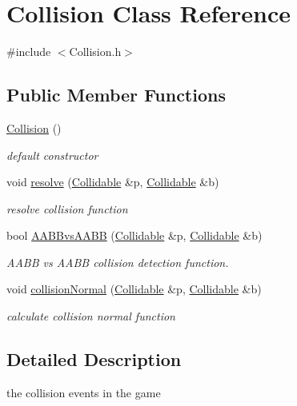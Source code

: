 \hypertarget{class_collision}{\section{Collision Class Reference}
\label{class_collision}
}


{\ttfamily \#include $<$Collision.\-h$>$}

\subsection*{Public Member Functions}
\begin{DoxyCompactItemize}
\item 
\hypertarget{class_collision_aea8004fbf48b79b5db7b784688b23788}{\hyperlink{class_collision_aea8004fbf48b79b5db7b784688b23788}{Collision} ()}\label{class_collision_aea8004fbf48b79b5db7b784688b23788}

\begin{DoxyCompactList}\small\item\em default constructor \end{DoxyCompactList}\item 
void \hyperlink{class_collision_a9e0c3a25faa3b248ada31d1b1ed3ca1f}{resolve} (\hyperlink{class_collidable}{Collidable} \&p, \hyperlink{class_collidable}{Collidable} \&b)
\begin{DoxyCompactList}\small\item\em resolve collision function \end{DoxyCompactList}\item 
bool \hyperlink{class_collision_a088f8187d085887c6d9ae22a036ba668}{A\-A\-B\-Bvs\-A\-A\-B\-B} (\hyperlink{class_collidable}{Collidable} \&p, \hyperlink{class_collidable}{Collidable} \&b)
\begin{DoxyCompactList}\small\item\em A\-A\-B\-B vs A\-A\-B\-B collision detection function. \end{DoxyCompactList}\item 
void \hyperlink{class_collision_a9a482367fa81abb763f83daf22127d4e}{collision\-Normal} (\hyperlink{class_collidable}{Collidable} \&p, \hyperlink{class_collidable}{Collidable} \&b)
\begin{DoxyCompactList}\small\item\em calculate collision normal function \end{DoxyCompactList}\end{DoxyCompactItemize}


\subsection{Detailed Description}
the collision events in the game 

